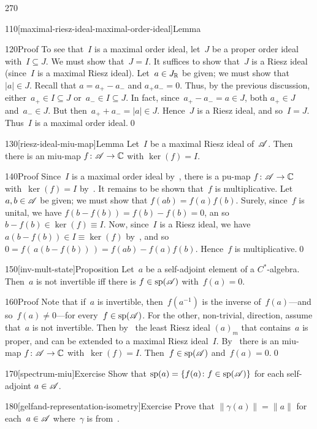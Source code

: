 \begin{parsec}{270}
\begin{point}{110}[maximal-riesz-ideal-maximal-order-ideal]{Lemma}
\begin{point}{120}{Proof}
To see that~$I$ is a maximal order ideal,
let~$J$ be a proper order ideal with~$I\subseteq J$.
We must show that~$J=I$.
It suffices to show that~$J$ is a Riesz ideal
(since~$I$ is a maximal Riesz ideal).
Let~$a\in J_{\mathbb{R}}$ be given;
we must show that~$\left|a\right|\in J$.
Recall that $a=a_+-a_-$ and $a_+a_-=0$.
Thus, by the previous discussion, either~$a_+\in I\subseteq J$
or~$a_-\in I\subseteq J$.
In fact, since~$a_+-a_- = a\in J$,
both $a_+\in J$ and~$a_-\in J$.
But then~$a_++a_- = \left|a\right| \in J$.
Hence~$J$ is a Riesz ideal,
and so~$I=J$.
Thus~$I$ is a maximal order ideal.\qed
\end{point}
\end{point}
\begin{point}{130}[riesz-ideal-miu-map]{Lemma}%
Let~$I$ be a maximal Riesz ideal of~$\mathscr{A}$.
Then there is an miu-map $f\colon \mathscr{A}\to \mathbb{C}$
with $\ker(f)=I$.
\begin{point}{140}{Proof}%
Since~$I$ is a maximal order ideal 
by~,
there is a pu-map $f\colon \mathscr{A}\to \mathbb{C}$
with~$\ker(f)=I$ by~.
It remains to be shown that~$f$ is multiplicative.
Let~$a,b\in \mathscr{A}$ be given;
we must show that $f(ab)=f(a)f(b)$.
Surely, since~$f$ is unital,
we have $f(b-f(b))=f(b)-f(b)=0$,
an so $b-f(b)\in \ker(f)\equiv I$.
Now, since~$I$ is a Riesz ideal,
we have $a(b-f(b))\in I\equiv \ker(f)$ by~,
and so~$0=f(\,a(b-f(b))\,)=f(ab)-f(a)f(b)$.
Hence~$f$ is multiplicative.\qed
\end{point}
\end{point}
\begin{point}{150}[inv-mult-state]{Proposition}%
Let~$a$ be a self-adjoint element of a $C^*$-algebra.
Then~$a$ is not invertible
iff there is $f\in\mathrm{sp}(\mathscr{A})$ 
with~$f(a)=0$.
\begin{point}{160}{Proof}%
Note that if~$a$ is invertible,
then~$f(a^{-1})$ is the inverse of~$f(a)$---and so~$f(a)\neq 0$---for 
every~$f\in\mathrm{sp}(\mathscr{A})$.
For the other, non-trivial, direction,
assume that~$a$ is not invertible.
Then 
by~
the least Riesz ideal $(a)_m$
that contains~$a$ is proper,
and can be extended to a maximal Riesz ideal~$I$.
By~
there is an miu-map $f\colon \mathscr{A}\to\mathbb{C}$
with~$\ker(f)=I$.
Then~$f\in\mathrm{sp}(\mathscr{A})$
and~$f(a)=0$.\qed
\end{point}
\end{point}
\begin{point}{170}[spectrum-miu]{Exercise}%
Show that $\mathrm{sp}(a)=\{f(a)\colon f\in\mathrm{sp}(\mathscr{A})\}$
for each self-adjoint $a\in\mathscr{A}$.
\end{point}
\begin{point}{180}[gelfand-representation-isometry]{Exercise}%
Prove that $\|\gamma(a)\|=\|a\|$
for each~$a\in\mathscr{A}$
where~$\gamma$ is from~.


\end{point}
\end{parsec}
